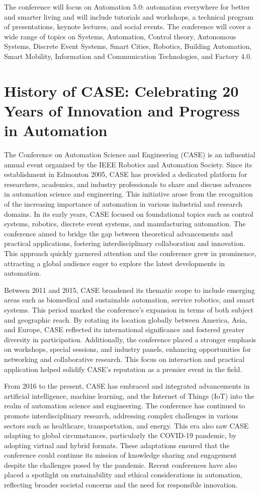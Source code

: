 \documentclass[
	openany, %
	parskip=full, %
	12pt, %
	a4paper, %
]{conferencebooklet} %
\begin{document}
The conference will focus on Automation 5.0: automation everywhere for better and smarter living and will include tutorials and workshops, a technical program of presentations, keynote lectures, and social events. The conference will cover a wide range of topics on Systems, Automation, Control theory, Autonomous Systems, Discrete Event Systems, Smart Cities, Robotics, Building Automation, Smart Mobility, Information and Communication Technologies, and Factory 4.0.

\section{History of CASE: Celebrating 20 Years of Innovation and Progress in Automation}
The Conference on Automation Science and Engineering (CASE) is an influential annual event organized by the IEEE Robotics and Automation Society. Since its establishment in Edmonton 2005, CASE has provided a dedicated platform for researchers, academics, and industry professionals to share and discuss advances in automation science and engineering. This initiative arose from the recognition of the increasing importance of automation in various industrial and research domains. In its early years, CASE focused on foundational topics such as control systems, robotics, discrete event systems, and manufacturing automation. The conference aimed to bridge the gap between theoretical advancements and practical applications, fostering interdisciplinary collaboration and innovation. This approach quickly garnered attention and the conference grew in prominence, attracting a global audience eager to explore the latest developments in automation.

Between 2011 and 2015, CASE broadened its thematic scope to include emerging areas such as biomedical and sustainable automation, service robotics, and smart systems. This period marked the conference’s expansion in terms of both subject and geographic reach. By rotating its location globally between America, Asia, and Europe, CASE reflected its international significance and fostered greater diversity in participation. Additionally, the conference placed a stronger emphasis on workshops, special sessions, and industry panels, enhancing opportunities for networking and collaborative research. This focus on interaction and practical application helped solidify CASE’s reputation as a premier event in the field.

From 2016 to the present, CASE has embraced and integrated advancements in artificial intelligence, machine learning, and the Internet of Things (IoT) into the realm of automation science and engineering. The conference has continued to promote interdisciplinary research, addressing complex challenges in various sectors such as healthcare, transportation, and energy. This era also saw CASE adapting to global circumstances, particularly the COVID-19 pandemic, by adopting virtual and hybrid formats. These adaptations ensured that the conference could continue its mission of knowledge sharing and engagement despite the challenges posed by the pandemic. Recent conferences have also placed a spotlight on sustainability and ethical considerations in automation, reflecting broader societal concerns and the need for responsible innovation.
\end{document}
